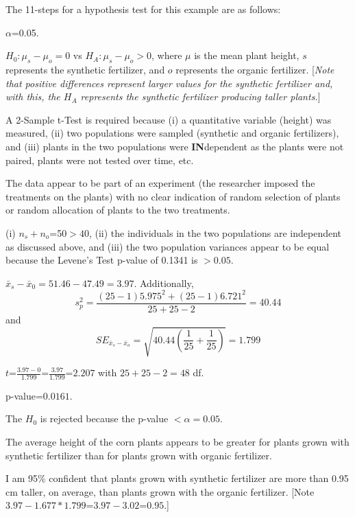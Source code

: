 \documentclass[10pt,openany]{book}\usepackage[]{graphicx}\usepackage[]{color}
\begin{document}
\vspace{-12pt}
The 11-steps  for a hypothesis test for this example are as follows:
\vspace{-12pt}
  \begin{Enumerate}
    \item $\alpha$=0.05.
    \item $H_{0}:\mu_{s}-\mu_{o}=0$ vs $H_{A}:\mu_{s}-\mu_{o}>0$, where $\mu$ is the mean plant height, $s$ represents the synthetic fertilizer, and $o$ represents the organic fertilizer. [\textit{Note that positive differences represent larger values for the synthetic fertilizer and, with this, the $H_{A}$ represents the synthetic fertilizer producing taller plants.}]
    \item A 2-Sample t-Test is required because (i) a quantitative variable (height) was measured, (ii) two populations were sampled (synthetic and organic fertilizers), and (iii) plants in the two populations were \textbf{IN}dependent as the plants were not paired, plants were not tested over time, etc.
    \item The data appear to be part of an experiment (the researcher imposed the treatments on the plants) with no clear indication of random selection of plants or random allocation of plants to the two treatments.
    \item (i) $n_{s}+n_{o}$=50$>40$, (ii) the individuals in the two populations are independent as discussed above, and (iii) the two population variances appear to be equal because the Levene's Test p-value of 0.1341 is $>0.05$.
    \item $\bar{x}_{s}-\bar{x}_{0}$$=51.46-47.49$$=3.97$. Additionally,
    \[s_{p}^{2}=\frac{(25-1)5.975^{2}+(25-1)6.721^{2}}{25+25-2} = 40.44 \]
and
    \[ SE_{\bar{x}_{s}-\bar{x}_{o}}=\sqrt{40.44\left(\frac{1}{25}+\frac{1}{25} \right)} = 1.799  \]
    \item $t$=$\frac{3.97-0}{1.799}$=$\frac{3.97}{1.799}$=$2.207$ with $25+25-2=48$ df.
    \item p-value=$0.0161$.     \item The $H_{0}$ is rejected because the p-value $<\alpha=0.05$.
    \item The average height of the corn plants appears to be greater for plants grown with synthetic fertilizer than for plants grown with organic fertilizer.
    \item I am 95\% confident that plants grown with synthetic fertilizer are more than 0.95 cm taller, on average, than plants grown with the organic fertilizer. [Note $3.97-1.677*1.799$=$3.97-3.02$=$0.95$.]
  \end{Enumerate}
\end{document}
